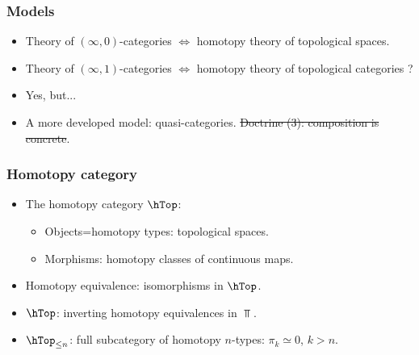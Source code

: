 \begin{frame}
	\frametitle{Models}
	\begin{itemize}
		\item
			Theory of $(\infty,0)$-categories $\Leftrightarrow$ homotopy theory of topological spaces. \pause
		\item
			Theory of $(\infty,1)$-categories $\Leftrightarrow$ homotopy theory of topological categories ? \pause
		\item
			Yes, but... \pause
		\item
			A more developed model: \alert{quasi-categories}. \pause \st{Doctrine (3): composition is concrete}.
		
	\end{itemize}

\end{frame}


\begin{frame}
	\frametitle{Homotopy category}

	\begin{itemize}
		\item 
			The \alert{homotopy category} $\hTop$: \pause
			\begin{itemize}
				\item 
					Objects=\alert{homotopy types}: topological spaces. \pause
				\item
					Morphisms: homotopy classes of continuous maps.  \pause
			\end{itemize}
		\item
			\alert{Homotopy equivalence}: isomorphisms in $\hTop$. \pause
		\item
			$\hTop$: inverting homotopy equivalences in $\Top$. \pause
		\item
			$\hTop_{\le n}$: full subcategory of \alert{homotopy $n$-types}: $\pi_k\simeq 0$, $k>n$.
	\end{itemize}

\end{frame}

